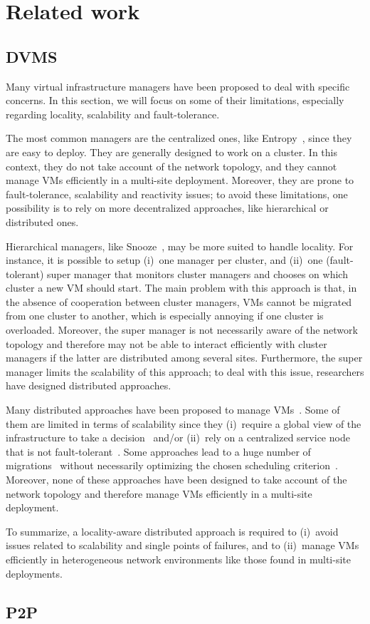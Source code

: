 \section{Related work}

\subsection{DVMS}

Many virtual infrastructure managers have been proposed to deal with specific
concerns.
%
In this section, we will focus on some of their limitations, especially
regarding locality, scalability and fault-tolerance.

The most common managers are the centralized ones, like
Entropy~\cite{hermenier:cp11}, since they are easy to deploy.
%
They are generally designed to work on a cluster.
%
In this context, they do not take account of the network topology, and they
cannot manage VMs efficiently in a multi-site deployment.
%
Moreover, they are prone to fault-tolerance, scalability and reactivity
issues; to avoid these limitations, one possibility is to rely on more
decentralized approaches, like hierarchical or distributed ones.

Hierarchical managers, like Snooze~\cite{feller:ccgrid12}, may be more suited to
handle locality.
%
For instance, it is possible to setup (i)~one manager per cluster, and (ii)~one
(fault-tolerant) super manager that monitors cluster managers and chooses on
which cluster a new VM should start.
%
%
The main problem with this approach is that, in the absence of cooperation
between cluster managers, VMs cannot be migrated from one cluster to another,
which is especially annoying if one cluster is overloaded.
%
Moreover, the super manager is not necessarily aware of the network topology and
therefore may not be able to interact efficiently with cluster managers if the
latter are distributed among several sites.
%
Furthermore, the super manager limits the scalability of this approach; to deal
with this issue, researchers have designed distributed approaches.

Many distributed approaches have been proposed to manage
VMs~\cite{barbagallo:lncs10,feller:cloudcom12,marzolla:wowmom11,mastroianni:europar11,rouzaudcornabas:vhpc10,yazir:cloud10}.
%
Some of them are limited in terms of scalability since they (i)~require a global
view of the infrastructure to take a
decision~\cite{rouzaudcornabas:vhpc10,yazir:cloud10} and/or (ii)~rely on a
centralized service node that is not
fault-tolerant~\cite{mastroianni:europar11,yazir:cloud10}.
%
Some approaches lead to a huge number of
migrations~\cite{barbagallo:lncs10,mastroianni:europar11} without necessarily
optimizing the chosen scheduling criterion~\cite{barbagallo:lncs10}.
%
Moreover, none of these approaches have been designed to take account of the
network topology and therefore manage VMs efficiently in a multi-site
deployment.

To summarize, a locality-aware distributed approach is required to (i)~avoid
issues related to scalability and single points of failures, and to (ii)~manage
VMs efficiently in heterogeneous network environments like those found in
multi-site deployments.

\subsection{P2P}

